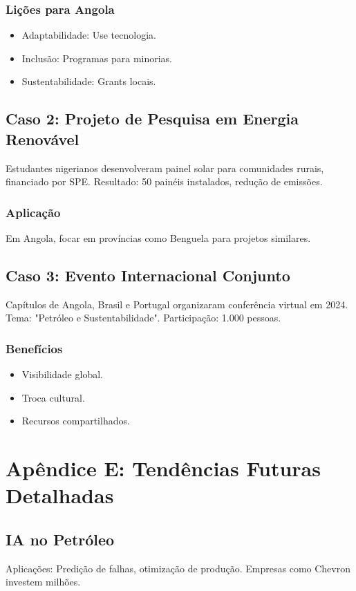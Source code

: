 \documentclass[12pt]{article}
\begin{document}
\subsubsection{Lições para Angola}
\begin{itemize}
    \item Adaptabilidade: Use tecnologia.
    \item Inclusão: Programas para minorias.
    \item Sustentabilidade: Grants locais.
\end{itemize}

\subsection{Caso 2: Projeto de Pesquisa em Energia Renovável}
Estudantes nigerianos desenvolveram painel solar para comunidades rurais, financiado por SPE. Resultado: 50 painéis instalados, redução de emissões.

\subsubsection{Aplicação}
Em Angola, focar em províncias como Benguela para projetos similares.

\subsection{Caso 3: Evento Internacional Conjunto}
Capítulos de Angola, Brasil e Portugal organizaram conferência virtual em 2024. Tema: "Petróleo e Sustentabilidade". Participação: 1.000 pessoas.

\subsubsection{Benefícios}
\begin{itemize}
    \item Visibilidade global.
    \item Troca cultural.
    \item Recursos compartilhados.
\end{itemize}

\clearpage
\section{Apêndice E: Tendências Futuras Detalhadas}

\subsection{IA no Petróleo}
Aplicações: Predição de falhas, otimização de produção. Empresas como Chevron investem milhões.
\end{document}
